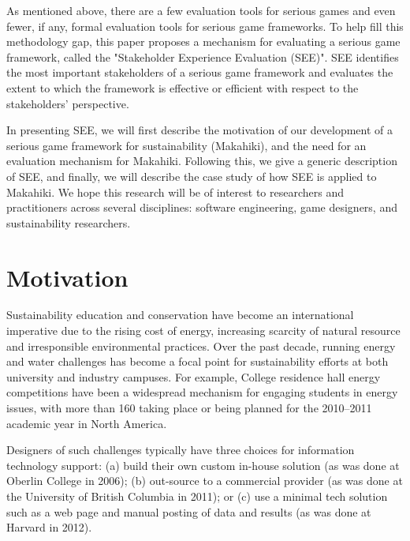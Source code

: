 \documentclass{sigchi}
\begin{document}

As mentioned above, there are a few evaluation tools for serious games
and even fewer, if any, formal evaluation tools for serious game
frameworks. To help fill this methodology gap, this paper proposes a
mechanism for evaluating a serious game framework, called the
"Stakeholder Experience Evaluation (SEE)". SEE identifies the most
important stakeholders of a serious game framework and evaluates the
extent to which the framework is effective or efficient with respect
to the stakeholders' perspective.

In presenting SEE, we will first describe the motivation of our
development of a serious game framework for sustainability (Makahiki),
and the need for an evaluation mechanism for Makahiki. Following this,
we give a generic description of SEE, and finally, we will describe
the case study of how SEE is applied to Makahiki. We hope this
research will be of interest to researchers and practitioners across
several disciplines: software engineering, game designers, and
sustainability researchers.

\section{Motivation}

Sustainability education and conservation have become an international
imperative due to the rising cost of energy, increasing scarcity of
natural resource and irresponsible environmental practices. Over the
past decade, running energy and water challenges has become a focal
point for sustainability efforts at both university and industry
campuses. For example, College residence hall energy competitions have
been a widespread mechanism for engaging students in energy issues,
with more than 160 taking place or being planned for the 2010--2011
academic year in North America\cite{Hodge2010}.

Designers of such challenges typically have three choices for
information technology support: (a) build their own custom in-house
solution (as was done at Oberlin College in
2006\cite{petersen-dorm-energy-reduction}); (b) out-source to a
commercial provider (as was done at the University of British Columbia
in 2011); or (c) use a minimal tech solution such as a web page and
manual posting of data and results (as was done at Harvard in 2012).
\end{document}
